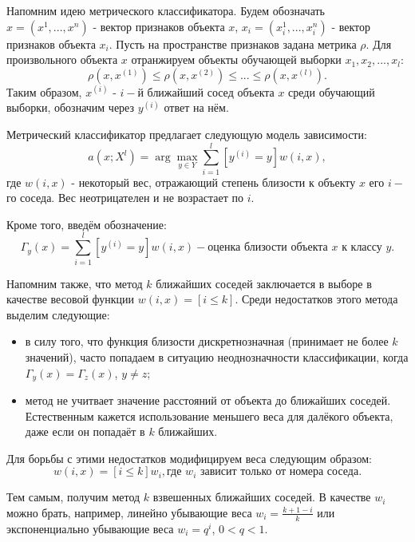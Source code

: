 Напомним идею метрического классификатора. Будем обозначать $x = (x^1, ..., x^n)$ - вектор признаков объекта $x$, $x_i = (x_i^1, ..., x_i^n)$ - вектор признаков объекта $x_i$. Пусть на пространстве признаков задана метрика $\rho$. Для произвольного объекта $x$ отранжируем объекты обучающей выборки $x_1, x_2, ..., x_l$:
\begin{equation*}
	\rho(x, x^{(1)}) \le \rho(x, x^{(2)}) \le ... \le \rho(x, x^{(l)}).
\end{equation*}
Таким образом, $x^{(i)}$ - $i-$й ближайший сосед объекта $x$ среди обучающий выборки, обозначим через $y^{(i)}$ ответ на нём. 

Метрический классификатор предлагает следующую модель зависимости:
\begin{equation*}
	\displaystyle a(x; X^l) = \arg\max_{y\in Y} \sum\limits_{i=1}^l[y^{(i)}=y]w(i,x), 
\end{equation*}
где $w(i,x)$ - некоторый вес, отражающий степень близости к объекту $x$ его $i-$го соседа. Вес неотрицателен и не возрастает по $i$. 

Кроме того, введём обозначение:
\begin{equation*}
	\displaystyle \Gamma_y(x) = \sum\limits_{i=1}^l[y^{(i)}=y]w(i,x) - \text{оценка близости объекта $x$ к классу $y$}. 
\end{equation*}

Напомним также, что метод $k$ ближайших соседей заключается в выборе в качестве весовой функции $w(i,x) = [i\le k]$. Среди недостатков этого метода выделим следующие:
\begin{itemize}
	\item в силу того, что функция близости дискретнозначная (принимает не более $k$ значений), часто попадаем в ситуацию неоднозначности классификации, когда $\Gamma_y(x) = \Gamma_z(x)$, $y\ne z$;
	\item метод не учитвает значение расстояний от объекта до ближайших соседей. Естественным кажется использование меньшего веса для далёкого объекта, даже если он попадаёт в $k$ ближайших.
\end{itemize}

Для борьбы с этими недостатков модифицируем веса следующим образом:
\begin{equation*}
	w(i,x) = [i\le k]w_i, \text{где $w_i$ зависит только от номера соседа}.
\end{equation*}

Тем самым, получим метод $k$ взвешенных ближайших соседей. В качестве $w_i$ можно брать, например, линейно убывающие веса $\displaystyle w_i = \frac{k+1-i}{k}$ или экспоненциально убывающие веса $w_i = q^i$, $0 < q < 1$.

